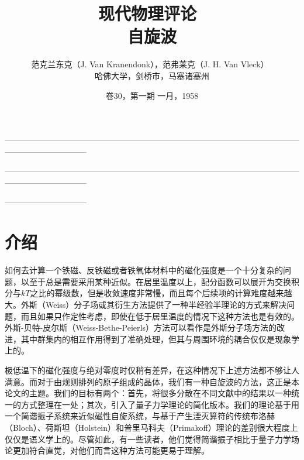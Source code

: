 \documentclass{article}
\begin{document}

\title{{\vspace{-80pt}\normalsize 现代物理评论}~\\\textbf{自旋波}}
\author{范克兰东克（J. Van Kranendonk），范弗莱克（J. H. Van Vleck）~\\哈佛大学，剑桥市，马塞诸塞州}
\date{卷30，第一期 \hfill 一月，1958}
\maketitle

{\vspace{-53pt}\centerline{——————————————————————————————————————————————}}
{\vspace{4pt}\centerline{——————————————————————————————————————————————}}

\vspace{0pt}
\tableofcontents

{\vspace{15pt}\centerline{——————————}\vspace{-10pt}}


\section{介绍} \label{sec:1}

如何去计算一个铁磁、反铁磁或者铁氧体材料中的磁化强度是一个十分复杂的问题，以至于总是需要采用某种近似。在居里温度以上，配分函数可以展开为交换积分与$kT$之比的幂级数，但是收敛速度非常慢，而且每个后续项的计算难度越来越大。外斯（Weiss）分子场或其衍生方法提供了一种半经验半理论的方式来解决问题，而且如果只作定性考虑，即使在低于居里温度的情况下这种方法也是有效的。外斯-贝特-皮尔斯（Weiss-Bethe-Peierls）方法可以看作是外斯分子场方法的改进，其中群集内的相互作用得到了准确处理，但其与周围环境的耦合仅仅是现象学上的。

极低温下的磁化强度与绝对零度时仅稍有差异，在这种情况下上述方法都不够让人满意。而对于由规则排列的原子组成的晶体，我们有一种自旋波的方法，这正是本论文的主题。我们的目标有两个：首先，将很多分散在不同文献中的结果以一种统一的方式整理在一处；其次，引入了量子力学理论的简化版本。我们的理论基于用一个简谐振子系统来近似磁性自旋系统，与基于产生湮灭算符的传统布洛赫（Bloch）、荷斯坦（Holstein）和普里马科夫（Primakoff）理论的差别很大程度上仅仅是语义学上的。尽管如此，有一些读者，他们觉得简谐振子相比于量子力学场论更加符合直觉，对他们而言这种方法可能更易于理解。
\end{document}
